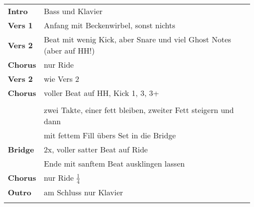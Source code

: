 
\begin{tabular}{p{1.6cm}l}
	\textbf{Intro}  & Bass und Klavier                                                    \\
	\textbf{Vers 1} & Anfang mit Beckenwirbel, sonst nichts                               \\
	\textbf{Vers 2} & Beat mit wenig Kick, aber Snare und viel Ghost Notes (aber auf HH!) \\
	\textbf{Chorus} & nur Ride                                                            \\
	\textbf{Vers 2} & wie Vers 2                                                          \\
	\textbf{Chorus} & voller Beat auf HH, Kick 1, 3, 3+                                   \\
	                &                                                                     \\
	                & zwei Takte, einer fett bleiben, zweiter Fett steigern und dann      \\
	                & mit fettem Fill übers Set in die Bridge                             \\
	\textbf{Bridge} & 2x, voller satter Beat auf Ride                                     \\
	                & Ende mit sanftem Beat ausklingen lassen                             \\
	\textbf{Chorus} & nur Ride $\frac{1}{4}$                                              \\
	\textbf{Outro}  & am Schluss nur Klavier                                              \\
	                &                                                                     \\
\end{tabular}
